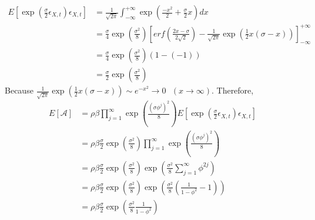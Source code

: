 \documentclass[11pt,a4,twosided,singlespacing,titlepagenumber=on]{scrreprt}
\numberwithin{equation}{chapter} %
\theoremstyle{remark}
\begin{document}
\begin{align*}
E\left[\exp \left( \frac{\sigma}{2} \epsilon_{X,t} \right) \epsilon_{X,t} \right] &= \frac{1}{\sqrt{2\pi}} \int^{+\infty}_{-\infty} \exp \left( \frac{-x^2}{2} + \frac{\sigma}{2} x \right) dx \\
																				  &= \frac{\sigma}{4} \exp \left(\frac{\sigma^2}{8}\right) \left[ erf \left(\frac{2x-\sigma}{2\sqrt{2}} \right) - \frac{1}{\sqrt{2\pi}}\exp \left(\frac{1}{2} x(\sigma-x) \right) \right]^{+\infty}_{-\infty} \\
																				  &= \frac{\sigma}{4} \exp \left(\frac{\sigma^2}{8}\right) (1 - (-1)) \\
																				  &= \frac{\sigma}{2} \exp \left(\frac{\sigma^2}{8}\right)
\end{align*}
Because $\frac{1}{\sqrt{2\pi}}\exp \left(\frac{1}{2} x(\sigma-x) \right) \sim e^{-x^2} \rightarrow 0 \text{ }(x \rightarrow \infty)$. Therefore, 
\begin{align*}
	E[\mathcal{A}] &= \rho \beta \prod_{j=1}^\infty \exp \left(\frac{(\sigma\phi^j)^2}{8} \right) E\left[\exp \left( \frac{\sigma}{2} \epsilon_{X,t} \right) \epsilon_{X,t} \right] \\
				   &= \rho \beta \frac{\sigma}{2} \exp \left(\frac{\sigma^2}{8}\right) \prod_{j=1}^\infty \exp \left(\frac{(\sigma\phi^j)^2}{8} \right) \\
				   &= \rho \beta \frac{\sigma}{2} \exp \left(\frac{\sigma^2}{8}\right) \exp \left( \frac{\sigma^2}{8} \sum_{j=1}^\infty \phi^{2j} \right) \\
				   &= \rho \beta \frac{\sigma}{2} \exp \left(\frac{\sigma^2}{8}\right) \exp \left( \frac{\sigma^2}{8} \left(\frac{1}{1-\phi^{2}} - 1\right)\right) \\
           &= \rho \beta \frac{\sigma}{2} \exp \left( \frac{\sigma^2}{8} \frac{1}{1-\phi^{2}} \right)
\end{align*}
\end{document}
